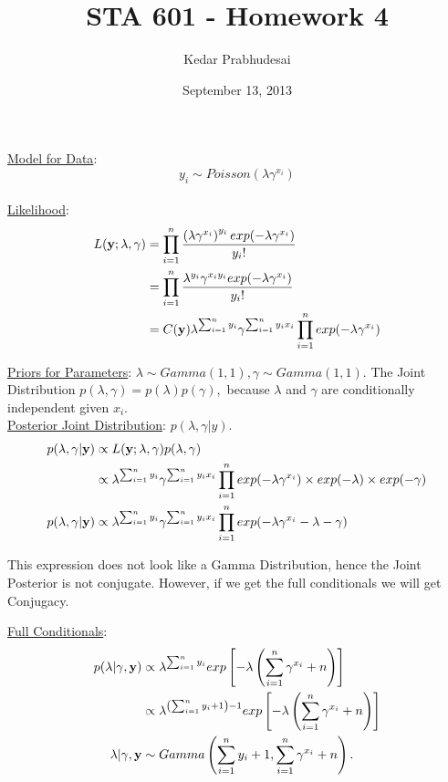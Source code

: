 \documentclass{article}
\title{STA 601 - Homework 4}
\author{Kedar Prabhudesai}
\date{September 13, 2013}
\begin{document}
\maketitle
\noindent \underline{Model for Data}: $$y_i \sim Poisson(\lambda\gamma^{x_i})$$\\
\noindent \underline{Likelihood}: 
\begin{align*}
L(\bold{y};\lambda,\gamma) &= \prod_{i=1}^{n}\frac{\left(\lambda\gamma^{x_i} \right)^{y_i}exp(-\lambda\gamma^{x_i} )}{y_i!}\\
&= \prod_{i=1}^{n}\frac{\lambda^{y_i}\gamma^{x_iy_i}exp(-\lambda\gamma^{x_i} )}{y_i!}\\
&= C(\bold{y})\lambda^{\sum_{i=1}^{n}y_i}\gamma^{\sum_{i=1}^{n}y_ix_i}\prod_{i=1}^{n}exp(-\lambda\gamma^{x_i} )\\
\end{align*}

\noindent \underline{Priors for Parameters}: $\lambda \sim Gamma(1,1), \gamma \sim Gamma(1,1).$ The Joint Distribution $p(\lambda,\gamma)=p(\lambda)p(\gamma),$ because $\lambda$ and $\gamma$ are conditionally independent given $x_i.$\\

\noindent \underline{Posterior Joint Distribution}: $p(\lambda,\gamma|y).$
\begin{align*}
p(\lambda,\gamma | \bold{y}) &\propto L(\bold{y};\lambda,\gamma)p(\lambda,\gamma)\\
&\propto \lambda^{\sum_{i=1}^{n}y_i}\gamma^{\sum_{i=1}^{n}y_ix_i}\prod_{i=1}^{n} exp(-\lambda\gamma^{x_i})\times exp(-\lambda) \times exp(-\gamma)\\
p(\lambda,\gamma|\bold{y}) &\propto \lambda^{\sum_{i=1}^{n}y_i}\gamma^{\sum_{i=1}^{n}y_ix_i}\prod_{i=1}^{n} exp(-\lambda\gamma^{x_i} -\lambda -\gamma)\\
\end{align*}

\noindent This expression does not look like a Gamma Distribution, hence the Joint Posterior is not conjugate. However, if we get the full conditionals we will get Conjugacy.
\pagebreak

\noindent \underline{Full Conditionals}:
\begin{align*}
p(\lambda|\gamma,\bold{y}) &\propto \lambda^{\sum_{i=1}^{n}y_i} exp\left[-\lambda\left(\sum_{i=1}^{n}\gamma^{x_i}+n\right)\right]\\
&\propto \lambda^{\left(\sum_{i=1}^{n}y_i + 1 \right)- 1} exp\left[-\lambda\left(\sum_{i=1}^{n}\gamma^{x_i}+n\right)\right]\\
\lambda|\gamma,\bold{y} &\sim Gamma\left(\sum_{i=1}^{n}y_i + 1,\sum_{i=1}^{n}\gamma^{x_i}+n\right).\\
\end{align*}
\end{document}
